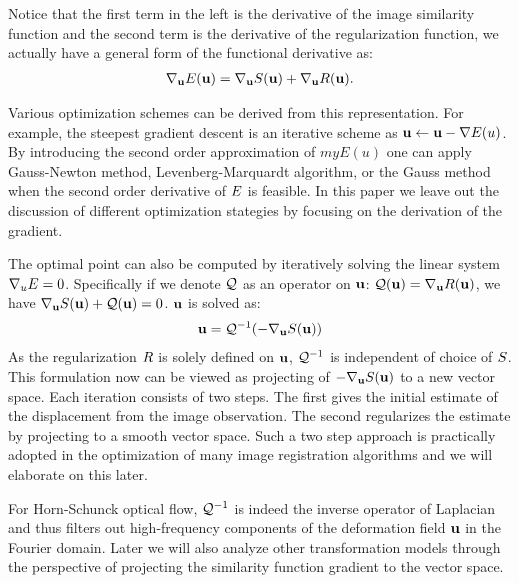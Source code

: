 \documentclass[letterpaper,12pt]{article}
\begin{document}
Notice that the first term in the left is the derivative of the image similarity function and the second term is the derivative of the regularization function, we actually have a general form of the functional derivative as:
\begin{align}
\nabla_{\mathbf{u}} E(\mathbf{u}) = \nabla_{\mathbf{u}} S(\mathbf{u}) + \nabla_{\mathbf{u}} R(\mathbf{u}).
\end{align}


Various optimization schemes can be derived from this representation. For example, the steepest gradient descent is an iterative scheme as $\mathbf{u} \leftarrow \mathbf{u} - \nabla E(u)$. By introducing the second order approximation of $myE(u)$ one can apply Gauss-Newton method, Levenberg-Marquardt algorithm, or the Gauss method when the second order derivative of $E$ is feasible. In this paper we leave out the discussion of different optimization stategies by focusing on the derivation of the gradient.

The optimal point can also be computed by iteratively solving the linear system $\nabla_u E = 0$. 
Specifically if we denote $\mathcal{Q}$ as an operator on $\mathbf{u}$: $\mathcal{Q}(\mathbf{u}) = \nabla_{\mathbf{u}} R(\mathbf{u})$, we have $\nabla_{\mathbf{u}} S(\mathbf{u}) + \mathcal{Q}(\mathbf{u}) = 0$. $\mathbf{u}$ is solved as: 
\begin{align}
\mathbf{u} = \mathcal{Q}^{-1}(-\nabla_{\mathbf{u}} S(\mathbf{u}))
\label{eq:projection}
\end{align}
As the regularization $R$ is solely defined on $\mathbf{u}$, $\mathcal{Q}^{-1}$ is
independent of choice of $S$. This formulation now can be viewed as
projecting of $-\nabla_{\mathbf{u}} S(\mathbf{u})$ to a new vector space. Each iteration
consists of two steps. The first gives the initial estimate of the displacement from the image observation. The second regularizes the estimate by projecting to a smooth vector space. Such a two step approach is practically adopted in the optimization of many image registration algorithms and we will elaborate on this later.

For Horn-Schunck optical flow, $\mathcal{Q}^{-1}$ is indeed the inverse
operator of Laplacian and thus filters out high-frequency components
of the deformation field $\mathbf{u}$ in the Fourier domain. Later we will
also analyze other transformation models through the perspective of
projecting the similarity function gradient to the vector space.	
\end{document}
